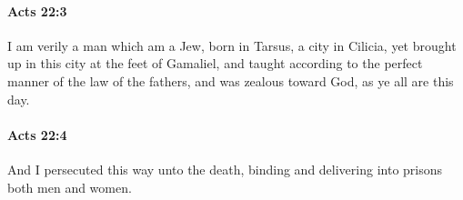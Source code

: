 		\paragraph{Acts 22:3} %
			\label{ACTS-22-3}

			I am verily a man which am a Jew, born in Tarsus, a city in Cilicia, yet brought up in this city at the feet of Gamaliel, and taught according to the perfect manner of the law of the fathers, and was zealous toward God, as ye all are this day.

			\begin{framed}
			\scriptsize
				\begin{compactdesc}
					\item[SBLG] 
				\end{compactdesc}
			\end{framed}

		\paragraph{Acts 22:4} %
			\label{ACTS-22-4}

			And I persecuted this way unto the death, binding and delivering into prisons both men and women.

